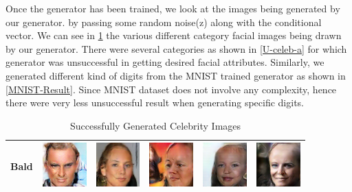 Once the generator has been trained, we look at the images being generated by our generator. by passing some random noise(z) along with the conditional vector. We can see in \cref{Celeb-a} the various different category facial images being drawn by our generator. There were several categories as shown in \cref{U-celeb-a} for which generator was unsuccessful in getting desired facial attributes. Similarly, we generated different kind of digits from the MNIST trained generator as shown in \cref{MNIST-Result}. Since MNIST dataset does not involve any complexity, hence there were very less unsuccessful result when generating specific digits.

  

\begin{table}[ht]
\centering
\caption{Successfully Generated Celebrity Images}
\label{Celeb-a}
\begin{tabular}{|llllll|}
\hline
Bald & \includegraphics[width=1.69cm, height=1.69cm]{Files/images/images1/image100.png}  &\includegraphics[width=1.69cm, height=1.69cm]{Files/images/images1/image2.png}   & \includegraphics[width=1.69cm, height=1.69cm]{Files/images/images1/image3.png}  & \includegraphics[width=1.69cm, height=1.69cm]{Files/images/images1/image52.png}  & \includegraphics[width=1.69cm, height=1.69cm]{Files/images/images1/image68.png} \\ \hline



\end{tabular}
\end{table}
